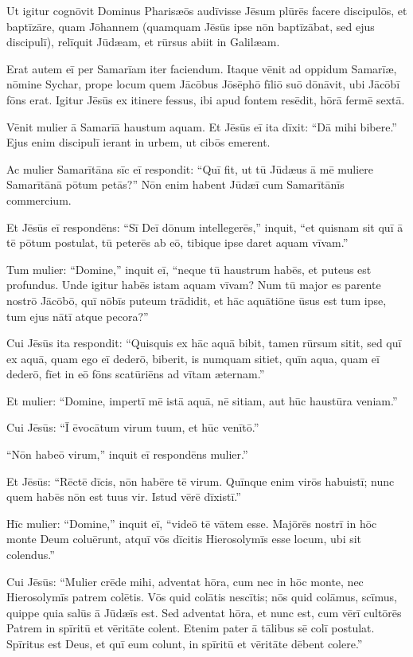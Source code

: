 \Caput
\Versus Ut igitur cognōvit Dominus Pharisæōs audīvisse Jēsum plūrēs facere discipulōs, et baptīzāre, quam Jōhannem
\Versus (quamquam Jēsūs ipse nōn baptīzābat, sed ejus discipulī),
\Versus relīquit Jūdæam, et rūrsus abiit in Galilæam.

\Versus Erat autem eī per Samarīam iter faciendum.
\Versus Itaque vēnit ad oppidum Samarīæ, nōmine Sychar, prope locum quem Jācōbus Jōsēphō fīliō suō dōnāvit,
\Versus ubi Jācōbī fōns erat. Igitur Jēsūs ex itinere fessus, ibi apud fontem resēdit, hōrā fermē sextā.

\Versus Vēnit mulier ā Samarīā haustum aquam. Et Jēsūs eī ita dīxit: ``Dā mihi bibere.''
\Versus Ejus enim discipulī ierant in urbem, ut cibōs emerent.

\Versus Ac mulier Samarītāna sīc eī respondit: ``Quī fit, ut tū Jūdæus ā mē muliere Sama\-rītānā pōtum petās?'' Nōn enim habent Jūdæī cum Samarītānīs commercium.

\Versus Et Jēsūs eī respondēns: ``Sī Deī dōnum intellegerēs,'' inquit, ``et quisnam sit quī ā tē pōtum postulat, tū peterēs ab eō, tibique ipse daret aquam vīvam.''

\Versus Tum mulier: ``Domine,'' inquit eī, ``neque tū haustrum habēs, et puteus est profundus. Unde igitur habēs istam aquam vīvam?
\Versus Num tū major es parente nostrō Jācōbō, quī nōbīs puteum trādidit, et hāc aquātiōne ūsus est tum ipse, tum ejus nātī atque pecora?''

\Versus Cui Jēsūs ita respondit: ``Quisquis ex hāc aquā bibit, tamen rūrsum sitit,
\Versus sed quī ex aquā, quam ego eī dederō, biberit, is numquam sitiet, quīn aqua, quam eī dederō, fīet in eō fōns scatūriēns ad vītam æternam.''

\Versus Et mulier: ``Domine, impertī mē istā aquā, nē sitiam, aut hūc haustūra veniam.''

\Versus Cui Jēsūs: ``Ī ēvocātum virum tuum, et hūc venītō.''

\Versus ``Nōn habeō virum,'' inquit eī respondēns mulier.''

Et Jēsūs: ``Rēctē dīcis, nōn habēre tē virum.
\Versus Quīnque enim virōs habuistī; nunc quem habēs nōn est tuus vir. Istud vērē dīxistī.''

\Versus Hīc mulier: ``Domine,'' inquit eī, ``videō tē vātem esse.
\Versus Majōrēs nostrī in hōc monte Deum coluērunt, atquī vōs dīcitis Hierosolymīs esse locum, ubi sit colendus.''

\Versus Cui Jēsūs: ``Mulier crēde mihi, adventat hōra, cum nec in hōc monte, nec Hierosolymīs patrem colētis.
\Versus Vōs quid colātis nescītis; nōs quid colāmus, scīmus, quippe quia salūs ā Jūdæīs est.
\Versus Sed adventat hōra, et nunc est, cum vērī cultōrēs Patrem in spīritū et vēritāte colent. Etenim pater ā tālibus sē colī postulat.
\Versus Spīritus est Deus, et quī eum colunt, in spīritū et vēritāte dēbent colere.''

